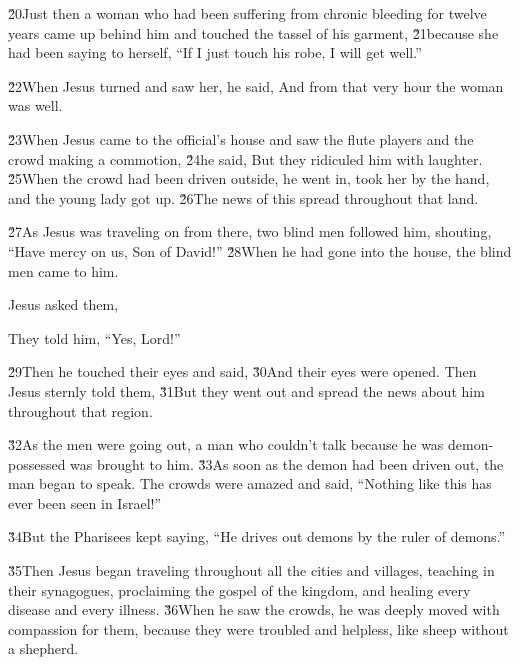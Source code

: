 \v{20}Just then a woman who had been suffering from chronic bleeding for twelve years came up behind him and touched the tassel of his garment, \v{21}because she had been saying to herself, ``If I just touch his robe, I will get well.''

\v{22}When Jesus turned and saw her, he said,  And from that very hour the woman was well.

\v{23}When Jesus came to the official's house and saw the flute players and the crowd making a commotion, \v{24}he said, \red{,} But they ridiculed him with laughter. \v{25}When the crowd had been driven outside, he went in, took her by the hand, and the young lady got up. \v{26}The news of this spread throughout that land.

\v{27}As Jesus was traveling on from there, two blind men followed him, shouting, ``Have mercy on us, Son of David!'' \v{28}When he had gone into the house, the blind men came to him.

Jesus asked them, 

They told him, ``Yes, Lord!''

\v{29}Then he touched their eyes and said,  \v{30}And their eyes were opened. Then Jesus sternly told them,  \v{31}But they went out and spread the news about him throughout that region.

\v{32}As the men were going out, a man who couldn't talk because he was demon-possessed was brought to him. \v{33}As soon as the demon had been driven out, the man began to speak. The crowds were amazed and said, ``Nothing like this has ever been seen in Israel!''

\v{34}But the Pharisees kept saying, ``He drives out demons by the ruler of demons.''

\v{35}Then Jesus began traveling throughout all the cities and villages, teaching in their synagogues, proclaiming the gospel of the kingdom, and healing every disease and every illness. \v{36}When he saw the crowds, he was deeply moved with compassion for them, because they were troubled and helpless, like sheep without a shepherd.


